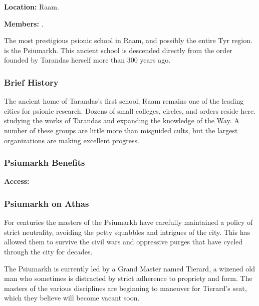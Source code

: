 \textbf{Location:} Raam.

\textbf{Members:} .

The most prestigious psionic school in Raam, and possibly the entire Tyr region. is the Psiumarkh. This ancient school is descended directly from the order founded by Tarandas herself more than 300 years ago.

\subsubsection{Brief History}
The ancient home of Tarandas's first school, Raam remains one of the leading cities for psionic research. Dozens of small colleges, circles, and orders reside here. studying the works of Tarandas and expanding the knowledge of the Way. A number of these groups are little more than misguided cults, but the largest organizations are making excellent progress.

\subsubsection{Psiumarkh Benefits}
\textbf{Access:} 

\subsubsection{Psiumarkh on Athas}
For centuries the masters of the Psiumarkh have carefully maintained a policy of strict neutrality, avoiding the petty squabbles and intrigues of the city. This has allowed them to survive the civil wars and oppressive purges that have cycled through the city for decades.

The Psiumarkh is currently led by a Grand Master named Tierard, a wizened old man who sometimes is distracted by strict adherence to propriety and form. The masters of the various disciplines are beginning to maneuver for Tierard's seat, which they believe will become vacant soon.


